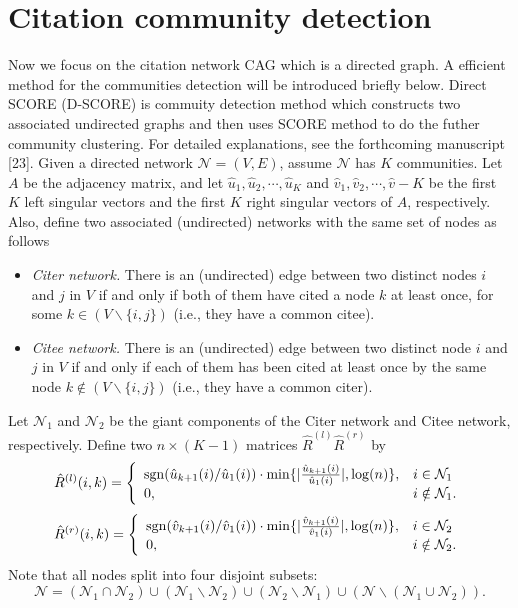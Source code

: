 \documentclass{article}
\numberwithin{equation}{section}
\newcommand{\sgn}{\mathrm{sgn}}
\begin{document}
\section{Citation community detection}
Now we focus on the citation network CAG which is a directed graph. A efficient method for the communities detection will be introduced briefly below.
Direct SCORE (D-SCORE) is commuity detection method which constructs two associated undirected graphs and then uses SCORE method to do the futher community clustering. For detailed explanations, see the forthcoming manuscript [23]. Given a directed network $\mathcal{N} = (V,E)$, assume $\mathcal{N}$ has $K$ communities. Let $A$ be the adjacency matrix, and let $\hat{u}_1,\hat{u}_2,\cdots,\hat{u}_K$ and $\hat{v}_1,\hat{v}_2,\cdots,\hat{v}-K$ be the first $K$ left singular vectors and the first $K$ right singular vectors of $A$, respectively. Also, define two associated (undirected) networks with the same set of nodes as follows
	\begin{itemize}
		\item \emph{Citer network.} There is an (undirected) edge between two distinct nodes $i$ and $j$ in $V$ if and only if both of them have cited a node $k$ at least once, for some $k \in (V \backslash \{i,j\})$ (i.e., they have a common citee).
		\item \emph{Citee network.} There is an (undirected) edge between two distinct node $i$ and $j$ in $V$ if and only if each of them has been cited at least once by the same node $k \notin (V \backslash \{i,j\})$ (i.e., they have a common citer).
	\end{itemize}
	
	
	\def\sgn{\mathop{\rm sgn}}
	
	Let $\mathcal{N}_1$ and $\mathcal{N}_2$ be the giant components of the Citer network and Citee network, respectively. Define two $n \times (K-1)$ matrices $\hat{R}^{(l)}$$\hat{R}^{(r)}$ by
	\[
	\hat{R}^{(l)}(i,k)=\left\{
	\begin{array}{ll}
	\sgn (\hat{u}_{k+1}(i)/\hat{u}_1(i))\cdot \min\{|\frac{\hat{u}_{k+1}(i)}{\hat{u}_{1}(i)}|,\log (n)\}, & \hbox{$i \in \mathcal{N}_1$}\\
	0, & \hbox{$i \notin \mathcal{N}_1$}.
	\end{array}
	\right.
	\]\[
	\hat{R}^{(r)}(i,k)=\left\{
	\begin{array}{ll}
	\sgn (\hat{v}_{k+1}(i)/\hat{v}_1(i))\cdot \min\{|\frac{\hat{v}_{k+1}(i)}{\hat{v}_{1}(i)}|,\log (n)\}, & \hbox{$i \in \mathcal{N}_2$} \\
	0, & \hbox{$i \notin \mathcal{N}_2$}.
	\end{array}
	\right.
	\]
	Note that all nodes split into four disjoint subsets:
	\[
	\mathcal{N} = (\mathcal{N}_1 \cap \mathcal{N}_2 ) \cup (\mathcal{N}_1 \backslash \mathcal{N}_2 ) \cup (\mathcal{N}_2 \backslash \mathcal{N}_1 ) \cup (\mathcal{N} \backslash (\mathcal{N}_1 \cup \mathcal{N}_2 )).
	\]
	
\end{document}
